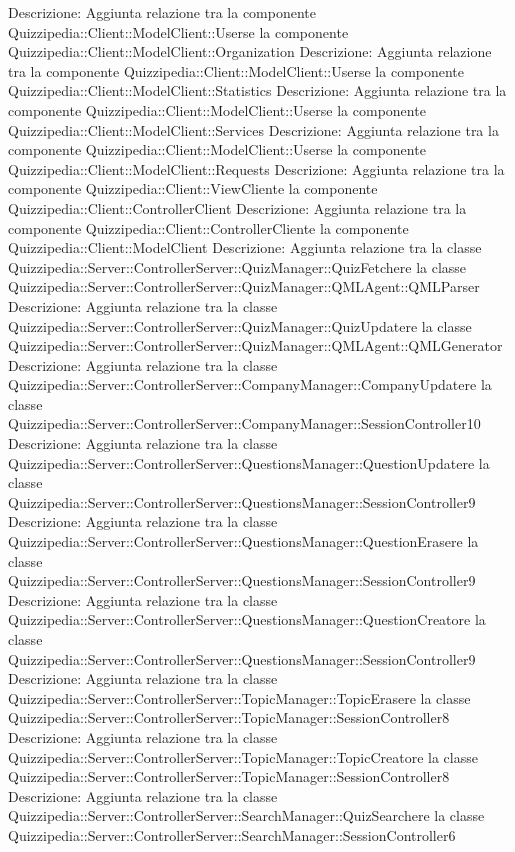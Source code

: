 Descrizione: Aggiunta relazione tra la componente Quizzipedia::Client::ModelClient::Userse la componente Quizzipedia::Client::ModelClient::Organization 
Descrizione: Aggiunta relazione tra la componente Quizzipedia::Client::ModelClient::Userse la componente Quizzipedia::Client::ModelClient::Statistics 
Descrizione: Aggiunta relazione tra la componente Quizzipedia::Client::ModelClient::Userse la componente Quizzipedia::Client::ModelClient::Services 
Descrizione: Aggiunta relazione tra la componente Quizzipedia::Client::ModelClient::Userse la componente Quizzipedia::Client::ModelClient::Requests 
Descrizione: Aggiunta relazione tra la componente Quizzipedia::Client::ViewCliente la componente Quizzipedia::Client::ControllerClient 
Descrizione: Aggiunta relazione tra la componente Quizzipedia::Client::ControllerCliente la componente Quizzipedia::Client::ModelClient 
Descrizione: Aggiunta relazione tra la classe Quizzipedia::Server::ControllerServer::QuizManager::QuizFetchere la classe Quizzipedia::Server::ControllerServer::QuizManager::QMLAgent::QMLParser 
Descrizione: Aggiunta relazione tra la classe Quizzipedia::Server::ControllerServer::QuizManager::QuizUpdatere la classe Quizzipedia::Server::ControllerServer::QuizManager::QMLAgent::QMLGenerator 
Descrizione: Aggiunta relazione tra la classe Quizzipedia::Server::ControllerServer::CompanyManager::CompanyUpdatere la classe Quizzipedia::Server::ControllerServer::CompanyManager::SessionController10 
Descrizione: Aggiunta relazione tra la classe Quizzipedia::Server::ControllerServer::QuestionsManager::QuestionUpdatere la classe Quizzipedia::Server::ControllerServer::QuestionsManager::SessionController9 
Descrizione: Aggiunta relazione tra la classe Quizzipedia::Server::ControllerServer::QuestionsManager::QuestionErasere la classe Quizzipedia::Server::ControllerServer::QuestionsManager::SessionController9 
Descrizione: Aggiunta relazione tra la classe Quizzipedia::Server::ControllerServer::QuestionsManager::QuestionCreatore la classe Quizzipedia::Server::ControllerServer::QuestionsManager::SessionController9 
Descrizione: Aggiunta relazione tra la classe Quizzipedia::Server::ControllerServer::TopicManager::TopicErasere la classe Quizzipedia::Server::ControllerServer::TopicManager::SessionController8 
Descrizione: Aggiunta relazione tra la classe Quizzipedia::Server::ControllerServer::TopicManager::TopicCreatore la classe Quizzipedia::Server::ControllerServer::TopicManager::SessionController8 
Descrizione: Aggiunta relazione tra la classe Quizzipedia::Server::ControllerServer::SearchManager::QuizSearchere la classe Quizzipedia::Server::ControllerServer::SearchManager::SessionController6 
